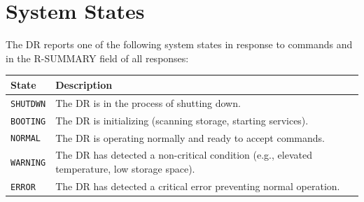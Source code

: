 \section{System States}
\label{sec:states}

The DR reports one of the following system states in response to 
commands and in the R-SUMMARY field of all responses:

\begin{longtable}{l p{10cm}}
\toprule
\textbf{State} & \textbf{Description} \\
\midrule
\endfirsthead
\endhead
\bottomrule
\endfoot

\texttt{SHUTDWN} &
    The DR is in the process of shutting down. \\

\texttt{BOOTING} &
    The DR is initializing (scanning storage, starting services). \\

\texttt{NORMAL~} &
    The DR is operating normally and ready to accept commands. \\

\texttt{WARNING} &
    The DR has detected a non-critical condition (e.g., elevated temperature,
    low storage space). \\

\texttt{ERROR~~} &
    The DR has detected a critical error preventing normal operation. \\

\end{longtable}

